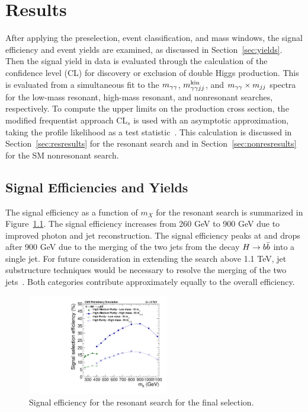 \chapter{Results\label{ch:results}}

After applying the preselection, event classification, and mass windows, the signal efficiency
and event yields are examined, as discussed in Section~\ref{sec:yields}. Then the signal yield
in data is evaluated through the calculation of the confidence level (CL)
for discovery or exclusion of double Higgs production. This is evaluated from a simultaneous fit
to the $m_{\gamma\gamma}$, $m_{\gamma\gamma jj}^{\rm kin}$, and $m_{\gamma\gamma} \times m_{jj}$ spectra for the low-mass resonant, high-mass resonant,
and nonresonant searches, respectively.
To compute the upper limits on the production cross section, the modified frequentist approach
$\text{CL}_s$ is used with an asymptotic approximation, taking the profile likelihood as a test
statistic~\cite{CLS1,CLS2}. This calculation is discussed in Section~\ref{sec:resresults} for the
resonant search and in Section~\ref{sec:nonresresults} for the SM nonresonant search.

\section{Signal Efficiencies and Yields\label{sec:yields}}

The signal efficiency as a function of $m_X$ for the resonant search is summarized in
Figure~\ref{fig:eff_res}. The signal efficiency increases from 260 GeV to 900 GeV
due to improved photon and jet reconstruction. The signal efficiency
peaks at and drops after 900 GeV due to the merging of the two jets from the decay $H\to b\bar{b}$ into
a single jet. For future consideration in extending the search above 1.1 TeV,
jet substructure techniques would be necessary to resolve the merging of the two
jets~\cite{Ellis:2009su}.
Both categories contribute approximately equally to the overall efficiency.

\begin{figure}[ht!]
 \begin{center}
    \includegraphics[width=0.55\textwidth]{figures/results/eff_all.pdf}
      \end{center}
\caption{Signal efficiency for the resonant search for the final selection.}
\label{fig:eff_res}
\end{figure}

